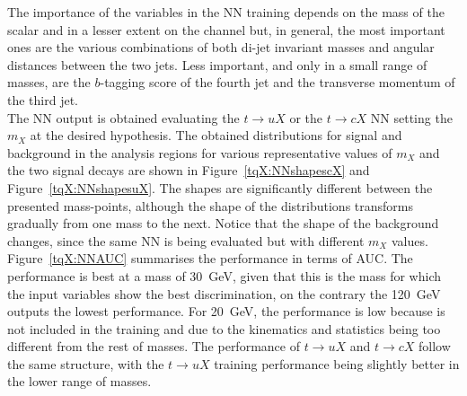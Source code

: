 The importance of the variables in the NN training depends on the mass of the scalar and in a lesser extent on the channel but, in general, the most important ones are the various combinations of both di-jet invariant masses and angular distances between the two jets. Less important, and only in a small range of masses, are the $b$-tagging score of the fourth jet and the transverse momentum of the third jet.\\

The NN output is obtained evaluating the $t\to uX$ or the $t\to cX$ NN setting the $m_X$ at the desired hypothesis. The obtained distributions for signal and background in the analysis regions for various representative values of $m_X$ and the two signal decays are shown in Figure~\ref{tqX:NNshapescX} and Figure~\ref{tqX:NNshapesuX}. The shapes are significantly different between the presented mass-points, although the shape of the distributions transforms gradually from one mass to the next. Notice that the shape of the background changes, since the same NN is being evaluated but with different $m_X$ values.\\

Figure~\ref{tqX:NNAUC} summarises the performance in terms of AUC. The performance is best at a mass of 30~GeV, given that this is the mass for which the input variables show the best discrimination, on the contrary the 120~GeV outputs the lowest performance. For 20~GeV, the performance is low because is not included in the training and due to the kinematics and statistics being too different from the rest of masses. The performance of $t\to uX$ and $t\to cX$ follow the same structure, with the $t\to uX$ training performance being slightly better in the lower range of masses.\\

